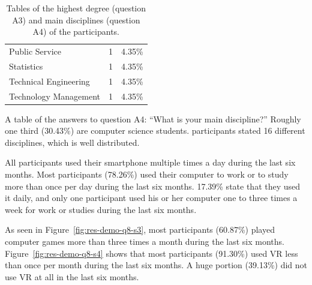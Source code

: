 \begin{table}[H]
\begin{subtable}[b]{.48\textwidth}
\begin{tabular}[b]{l c c}
			Public Service          & 1     & 4.35\%     \\
			Statistics              & 1     & 4.35\%     \\
			Technical Engineering   & 1     & 4.35\%     \\
			Technology Management   & 1     & 4.35\%     \\
			\bottomrule
		\end{tabular}
		\caption{A table of the answers to question A4: \enquote{What is your main discipline?} Roughly one third (30.43\%) are computer science students. \participantsCount{} participants stated 16 different disciplines, which is well distributed.}\label{tab:sus-discipline}
	\end{subtable}
	\caption[Degree and discipline of participants]{Tables of the highest degree (question A3) and main disciplines (question A4) of the participants.}\label{tab:sus-d}
\end{table}

All participants used their smartphone multiple times a day during the last six months. Most participants (78.26\%) used their computer to work or to study more than once per day during the last six months. 17.39\% state that they used it daily, and only one participant used his or her computer one to three times a week for work or studies during the last six months.

As seen in Figure~\ref{fig:res-demo-q8-s3}, most participants (60.87\%) played computer games more than three times a month during the last six months. Figure~\ref{fig:res-demo-q8-s4} shows that most participants (91.30\%) used \gls{VR} less than once per month during the last six months. A huge portion (39.13\%) did not use \gls{VR} at all in the last six months.

